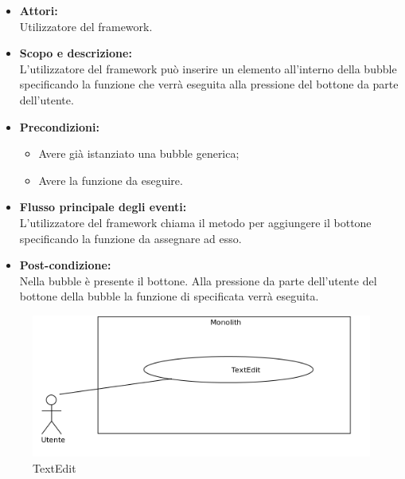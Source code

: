 \begin{itemize}
	\item \textbf{Attori:}
	\\Utilizzatore del framework.
	\item \textbf{Scopo e descrizione:} 
	\\L'utilizzatore del framework può inserire un elemento  all'interno della bubble specificando la funzione che verrà eseguita alla pressione del bottone da parte dell'utente.
	\item \textbf{Precondizioni:}
	\begin{itemize}
		\item Avere già istanziato una bubble generica;
		\item Avere la funzione da eseguire.
	\end{itemize}
	\item \textbf{Flusso principale degli eventi:}
	\\L'utilizzatore del framework chiama il metodo per aggiungere il bottone specificando la funzione da assegnare ad esso.
	\item \textbf{Post-condizione:}
	\\Nella bubble è presente il bottone. Alla pressione da parte dell'utente del bottone della bubble la funzione di  specificata verrà eseguita.
\end{itemize}


\begin{figure}[H]
	\centering
	\includegraphics[width=15cm]{../../documenti/AnalisiDeiRequisiti/Diagrammi_img/uc1_33.png}
	\caption{\UCFCaption{} TextEdit}
\end{figure}

